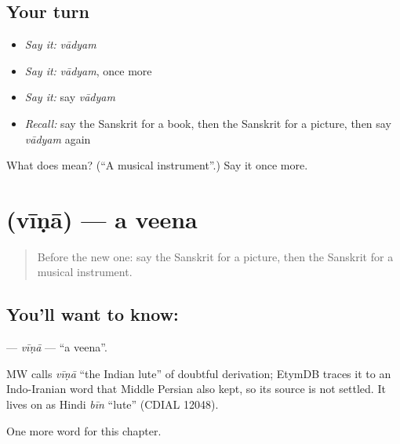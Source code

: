 \subsection*{Your turn}
\begin{itemize}
\raggedright
  \item \emph{Say it:} \emph{vādyam}
  \item \emph{Say it:} \emph{vādyam}, once more
  \item \emph{Say it:} say \emph{vādyam}
  \item \emph{Recall:} say the Sanskrit for a book, then the Sanskrit for a picture, then say \emph{vādyam} again
\end{itemize}

\begin{tcolorbox}[breakable,colback=teal!4,colframe=teal!35!black,title={Before you move on}]
What does  mean? (\textquotedblleft{}A musical instrument\textquotedblright{}.) Say it once more.
\end{tcolorbox}
\section[\texorpdfstring{\sk{वीणा} (vīṇā)}{वीणा (vīṇā)}]{ (vīṇā) — a veena}

\label{lesson:SA-C121-vina}



\begin{quote}
Before the new one: say the Sanskrit for a picture, then the Sanskrit for a musical instrument.
\end{quote}

\subsection*{You'll want to know: }
\textbf{} — \emph{vīṇā} — \textquotedblleft{}a veena\textquotedblright{}.

\begin{cousinweb}
MW calls \emph{vīṇā} \textquotedblleft{}the Indian lute\textquotedblright{} of doubtful derivation; EtymDB traces it to an Indo-Iranian word that Middle Persian also kept, so its source is not settled. It lives on as Hindi \emph{bīn} \textquotedblleft{}lute\textquotedblright{} (CDIAL 12048).
\end{cousinweb}

\begin{grammarlens}[title={What you've built}]
One more word for this chapter.
\end{grammarlens}

